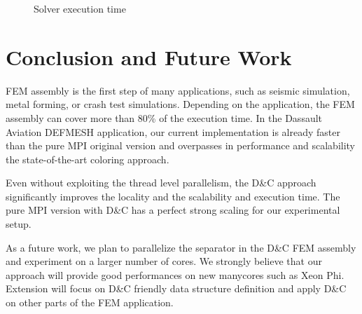 \documentclass{IOS-Book-Article}
\begin{document}
\begin{figure}[htp]
 \centering
 \caption{Solver execution time}
 \label{fig:solCurves}
\end{figure}

\section{Conclusion and Future Work}
FEM assembly is the first step of many applications, such as seismic simulation, metal forming, or crash test simulations. Depending on the application, the FEM assembly can cover more than 80\% of the execution time.
In the Dassault Aviation DEFMESH application, our current implementation is already faster than the pure MPI original version and overpasses in performance and scalability the state-of-the-art coloring approach.

Even without exploiting the thread level parallelism, the D\&C approach  significantly improves the locality and the scalability and execution time. The pure MPI version with D\&C has a perfect strong scaling for our experimental setup.

As a future work, we plan to parallelize the separator in the D\&C FEM assembly and experiment on a larger number of cores.
We strongly believe that our approach will provide good performances on new manycores such as Xeon Phi. Extension will focus on D\&C friendly data structure definition and apply D\&C on other parts of the FEM application. 


\end{document}
